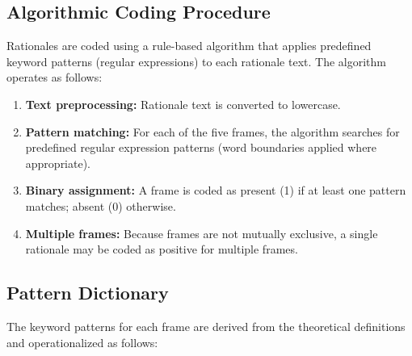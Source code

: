 \documentclass[11pt]{article}
\begin{document}
\subsection{Algorithmic Coding Procedure}

Rationales are coded using a rule-based algorithm that applies predefined keyword patterns (regular expressions) to each rationale text. The algorithm operates as follows:

\begin{enumerate}
\item \textbf{Text preprocessing:} Rationale text is converted to lowercase.
\item \textbf{Pattern matching:} For each of the five frames, the algorithm searches for predefined regular expression patterns (word boundaries applied where appropriate).
\item \textbf{Binary assignment:} A frame is coded as present (1) if at least one pattern matches; absent (0) otherwise.
\item \textbf{Multiple frames:} Because frames are not mutually exclusive, a single rationale may be coded as positive for multiple frames.
\end{enumerate}

\subsection{Pattern Dictionary}

The keyword patterns for each frame are derived from the theoretical definitions and operationalized as follows:
\end{document}
